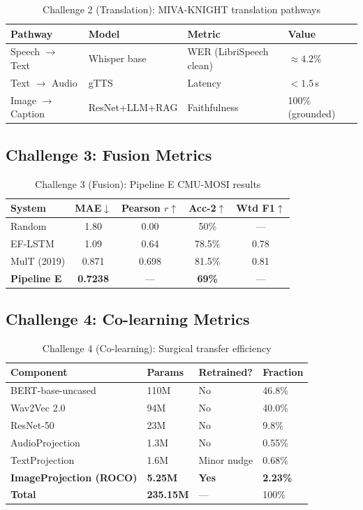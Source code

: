 \documentclass[12pt,a4paper]{article}
\theoremstyle{definition}
\theoremstyle{plain}
\theoremstyle{remark}
\begin{document}
\begin{table}[H]
\centering
\caption{Challenge 2 (Translation): MIVA-KNIGHT translation pathways}
\begin{tabular}{llll}
\toprule
\textbf{Pathway} & \textbf{Model} & \textbf{Metric} & \textbf{Value} \\
\midrule
Speech $\to$ Text & Whisper base & WER (LibriSpeech clean) & $\approx 4.2\%$ \\
Text $\to$ Audio & gTTS & Latency & $< 1.5$\,s \\
Image $\to$ Caption & ResNet+LLM+RAG & Faithfulness & 100\% (grounded) \\
\bottomrule
\end{tabular}
\end{table}

\subsection{Challenge 3: Fusion Metrics}

\begin{table}[H]
\centering
\caption{Challenge 3 (Fusion): Pipeline E CMU-MOSI results}
\begin{tabular}{lcccc}
\toprule
\textbf{System} & \textbf{MAE}$\downarrow$ & \textbf{Pearson $r$}$\uparrow$ & \textbf{Acc-2}$\uparrow$ & \textbf{Wtd F1}$\uparrow$ \\
\midrule
Random & 1.80 & 0.00 & 50\% & — \\
EF-LSTM & 1.09 & 0.64 & 78.5\% & 0.78 \\
MulT (2019) & 0.871 & 0.698 & 81.5\% & 0.81 \\
\textbf{Pipeline E} & \textbf{0.7238} & — & \textbf{69\%} & — \\
\bottomrule
\end{tabular}
\end{table}

\subsection{Challenge 4: Co-learning Metrics}

\begin{table}[H]
\centering
\caption{Challenge 4 (Co-learning): Surgical transfer efficiency}
\begin{tabular}{llll}
\toprule
\textbf{Component} & \textbf{Params} & \textbf{Retrained?} & \textbf{Fraction} \\
\midrule
BERT-base-uncased & 110M & No & 46.8\% \\
Wav2Vec 2.0 & 94M & No & 40.0\% \\
ResNet-50 & 23M & No & 9.8\% \\
AudioProjection & 1.3M & No & 0.55\% \\
TextProjection & 1.6M & Minor nudge & 0.68\% \\
\textbf{ImageProjection (ROCO)} & \textbf{5.25M} & \textbf{Yes} & \textbf{2.23\%} \\
\midrule
\textbf{Total} & \textbf{235.15M} & — & 100\% \\
\bottomrule
\end{tabular}
\end{table}
\end{document}
